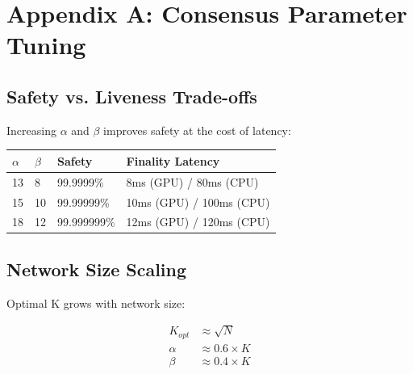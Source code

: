 \section{Appendix A: Consensus Parameter Tuning}


\subsection{Safety vs. Liveness Trade-offs}

Increasing $\alpha$ and $\beta$ improves safety at the cost of latency:

\begin{table}[h]
\centering
\begin{tabular}{@{}llll@{}}
\toprule
$\alpha$ & $\beta$ & \textbf{Safety} & \textbf{Finality Latency} \\
\midrule
13 & 8 & 99.9999\% & 8ms (GPU) / 80ms (CPU) \\
15 & 10 & 99.99999\% & 10ms (GPU) / 100ms (CPU) \\
18 & 12 & 99.999999\% & 12ms (GPU) / 120ms (CPU) \\
\bottomrule
\end{tabular}

\end{table}

\subsection{Network Size Scaling}

Optimal K grows with network size:

\begin{align}
K_{opt} &\approx \sqrt{N} \\
\alpha &\approx 0.6 \times K \\
\beta &\approx 0.4 \times K
\end{align}

